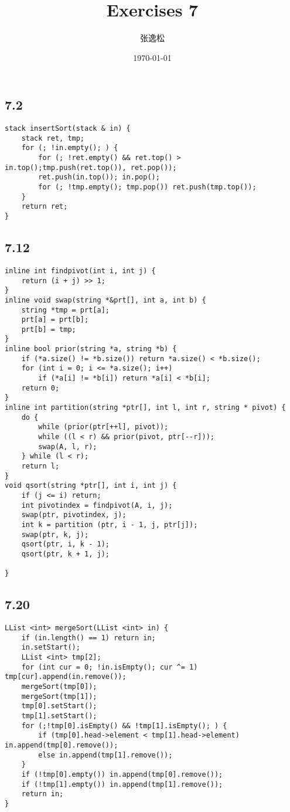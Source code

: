 \documentclass[12pt]{ctexart}
\title{Exercises 7}
\author{张逸松}
\date{\today}
\begin{document}
    \maketitle
    \subsection*{7.2}
        \begin{lstlisting}
stack insertSort(stack & in) {
    stack ret, tmp;
    for (; !in.empty(); ) {
        for (; !ret.empty() && ret.top() > in.top();tmp.push(ret.top()), ret.pop());
        ret.push(in.top()); in.pop();
        for (; !tmp.empty(); tmp.pop()) ret.push(tmp.top());
    }
    return ret;
}
        \end{lstlisting}
    \subsection*{7.12}
        \begin{lstlisting}
inline int findpivot(int i, int j) {
    return (i + j) >> 1;
}
inline void swap(string *&prt[], int a, int b) {
    string *tmp = prt[a];
    prt[a] = prt[b];
    prt[b] = tmp;
}
inline bool prior(string *a, string *b) {
    if (*a.size() != *b.size()) return *a.size() < *b.size();
    for (int i = 0; i <= *a.size(); i++) 
        if (*a[i] != *b[i]) return *a[i] < *b[i];
    return 0;
}
inline int partition(string *ptr[], int l, int r, string * pivot) {
    do {
        while (prior(ptr[++l], pivot));
        while ((l < r) && prior(pivot, ptr[--r]));
        swap(A, l, r);
    } while (l < r);
    return l;
}
void qsort(string *ptr[], int i, int j) {
    if (j <= i) return;
    int pivotindex = findpivot(A, i, j);
    swap(ptr, pivotindex, j);
    int k = partition (ptr, i - 1, j, ptr[j]);
    swap(ptr, k, j);
    qsort(ptr, i, k - 1);
    qsort(ptr, k + 1, j);

}
        \end{lstlisting}
    \subsection*{7.20}
        \begin{lstlisting}
LList <int> mergeSort(LList <int> in) {
    if (in.length() == 1) return in;
    in.setStart();
    LList <int> tmp[2];
    for (int cur = 0; !in.isEmpty(); cur ^= 1) tmp[cur].append(in.remove());
    mergeSort(tmp[0]);
    mergeSort(tmp[1]);
    tmp[0].setStart();
    tmp[1].setStart();
    for (;!tmp[0].isEmpty() && !tmp[1].isEmpty(); ) {
        if (tmp[0].head->element < tmp[1].head->element) in.append(tmp[0].remove());
        else in.append(tmp[1].remove());
    }
    if (!tmp[0].empty()) in.append(tmp[0].remove());
    if (!tmp[1].empty()) in.append(tmp[1].remove());
    return in;
}
        \end{lstlisting}
\end{document}
